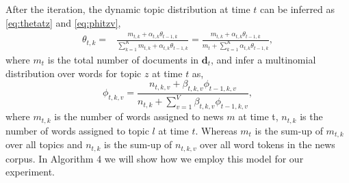 After the iteration, the dynamic topic distribution at time $t$ can be inferred as \eqref{eq:thetatz} and \eqref{eq:phitzv},
\begin{align}
\label{eq:thetatz}
\theta_{t, k}  = & \frac{ m_{t, k} + \alpha_{t, k}\theta_{t-1, k} }{ \sum_{k=1}^K m_{t, k} + \alpha_{t, k} \theta_{t-1, k}} = \frac{ m_{t, k} + \alpha_{t, k}\theta_{t-1, k} }{ m_t + \sum_{k=1}^K \alpha_{t, k}\theta_{t-1, k} },
\end{align}
where $m_t$ is the total number of documents in $\mathbf{d}_t$, and infer a multinomial distribution over words for topic $z$ at time $t$ as,
%
\begin{equation}
\label{eq:phitzv}
\phi_{t, k, v} =  \frac{ n_{t, k,v } + \beta_{t, k, v} \phi_{t-1, k, v} }{ n_{t,k} + \sum_{v=1}^V \beta_{t, k, v} \phi_{t-1, k, v} },
\end{equation}
where $m_{t,k}$ is the number of words assigned to news $m$ at time t, $n_{t, k}$ is the number of words assigned to topic $l$ at time $t$. Whereas $m_t$ is the sum-up of $m_{t,k}$ over all topics and $n_{t, k}$ is the sum-up of $n_{t, k, v}$ over all word tokens in the news corpus. In Algorithm 4 we will show how we employ this model for our experiment.
